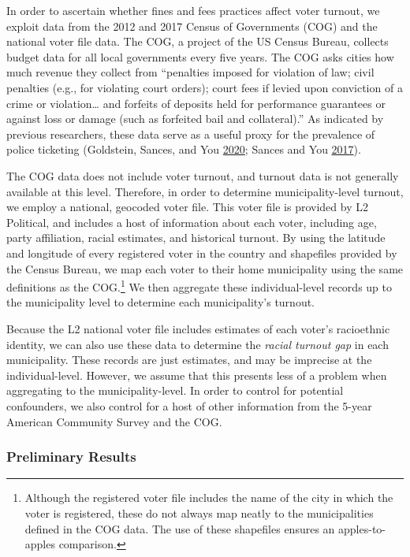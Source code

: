 \documentclass[
  12pt,
]{article}
\begin{document}
In order to ascertain whether fines and fees practices affect voter turnout, we exploit data from the 2012 and 2017 Census of Governments (COG) and the national voter file data. The COG, a project of the US Census Bureau, collects budget data for all local governments every five years. The COG asks cities how much revenue they collect from ``penalties imposed for violation of law; civil penalties (e.g., for violating court orders); court fees if levied upon conviction of a crime or violation\ldots{} and forfeits of deposits held for performance guarantees or against loss or damage (such as forfeited bail and collateral).'' As indicated by previous researchers, these data serve as a useful proxy for the prevalence of police ticketing (Goldstein, Sances, and You \protect\hyperlink{ref-Goldstein2020}{2020}; Sances and You \protect\hyperlink{ref-Sances2017}{2017}).

The COG data does not include voter turnout, and turnout data is not generally available at this level. Therefore, in order to determine municipality-level turnout, we employ a national, geocoded voter file. This voter file is provided by L2 Political, and includes a host of information about each voter, including age, party affiliation, racial estimates, and historical turnout. By using the latitude and longitude of every registered voter in the country and shapefiles provided by the Census Bureau, we map each voter to their home municipality using the same definitions as the COG.\footnote{Although the registered voter file includes the name of the city in which the voter is registered, these do not always map neatly to the municipalities defined in the COG data. The use of these shapefiles ensures an apples-to-apples comparison.} We then aggregate these individual-level records up to the municipality level to determine each municipality's turnout.

Because the L2 national voter file includes estimates of each voter's racioethnic identity, we can also use these data to determine the \emph{racial turnout gap} in each municipality. These records are just estimates, and may be imprecise at the individual-level. However, we assume that this presents less of a problem when aggregating to the municipality-level. In order to control for potential confounders, we also control for a host of other information from the 5-year American Community Survey and the COG.

\hypertarget{preliminary-results}{%
\subsubsection*{Preliminary Results}\label{preliminary-results}}
\end{document}
